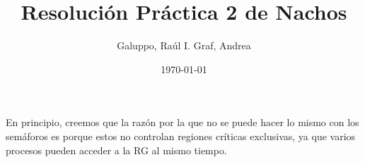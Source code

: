 \documentclass[a4paper, 11pt]{article}
\title{Resolución Práctica 2 de Nachos}
\author{Galuppo, Raúl I. Graf, Andrea}
\date{\today}
\begin{document}
\maketitle
En principio, creemos que la razón por la que no se puede hacer lo mismo con los semáforos es porque
estos no controlan regiones críticas exclusivas, ya que varios procesos pueden acceder a la RG al 
mismo tiempo.
\end{document}

